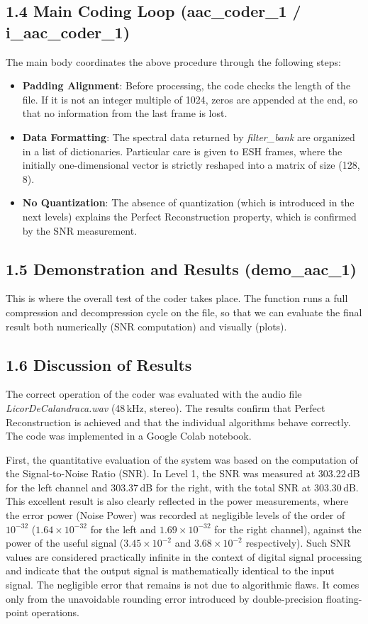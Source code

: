 \documentclass[11pt,twocolumn]{article}
\newcommand{\fn}[1]{\textit{#1}}
\newcommand{\sub}[1]{\subsection*{#1}}
\begin{document}
\sub{1.4 Main Coding Loop (aac\_coder\_1 / i\_aac\_coder\_1)}
The main body coordinates the above procedure through the following steps:
\begin{itemize}
  \item \textbf{Padding Alignment}: Before processing, the code checks the length of the file. If it is not an integer multiple of 1024, zeros are appended at the end, so that no information from the last frame is lost.
  \item \textbf{Data Formatting}: The spectral data returned by \fn{filter\_bank} are organized in a list of dictionaries. Particular care is given to ESH frames, where the initially one-dimensional vector is strictly reshaped into a matrix of size (128, 8).
  \item \textbf{No Quantization}: The absence of quantization (which is introduced in the next levels) explains the Perfect Reconstruction property, which is confirmed by the SNR measurement.
\end{itemize}

\sub{1.5 Demonstration and Results (demo\_aac\_1)}
This is where the overall test of the coder takes place. The function runs a full compression and decompression cycle on the file, so that we can evaluate the final result both numerically (SNR computation) and visually (plots).

\sub{1.6 Discussion of Results}
The correct operation of the coder was evaluated with the audio file \fn{LicorDeCalandraca.wav} (48\,kHz, stereo). The results confirm that Perfect Reconstruction is achieved and that the individual algorithms behave correctly. The code was implemented in a Google Colab notebook.

First, the quantitative evaluation of the system was based on the computation of the Signal-to-Noise Ratio (SNR). In Level 1, the SNR was measured at 303.22\,dB for the left channel and 303.37\,dB for the right, with the total SNR at 303.30\,dB. This excellent result is also clearly reflected in the power measurements, where the error power (Noise Power) was recorded at negligible levels of the order of $10^{-32}$ ($1.64\times10^{-32}$ for the left and $1.69\times10^{-32}$ for the right channel), against the power of the useful signal ($3.45\times10^{-2}$ and $3.68\times10^{-2}$ respectively). Such SNR values are considered practically infinite in the context of digital signal processing and indicate that the output signal is mathematically identical to the input signal. The negligible error that remains is not due to algorithmic flaws. It comes only from the unavoidable rounding error introduced by double-precision floating-point operations.
\end{document}
